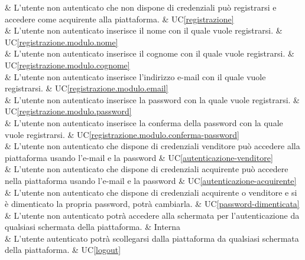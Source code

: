  & L'utente non autenticato che non dispone di credenziali può registrarsi e accedere come acquirente alla piattaforma. & UC\ref{registrazione} \\ 

 & L'utente non autenticato inserisce il nome con il quale vuole registrarsi. & UC\ref{registrazione.modulo.nome} \\

 & L'utente non autenticato inserisce il cognome con il quale vuole registrarsi. & UC\ref{registrazione.modulo.cognome} \\

 & L'utente non autenticato inserisce l'indirizzo e-mail con il quale vuole registrarsi. & UC\ref{registrazione.modulo.email} \\

 & L'utente non autenticato inserisce la password con la quale vuole registrarsi. & UC\ref{registrazione.modulo.password} \\

 & L'utente non autenticato inserisce la conferma della password con la quale vuole registrarsi. & UC\ref{registrazione.modulo.conferma-password} \\

 & L'utente non autenticato che dispone di credenziali venditore può accedere alla piattaforma usando l'e-mail e la password & UC\ref{autenticazione-venditore} \\

 & L'utente non autenticato che dispone di credenziali acquirente può accedere nella piattaforma usando l'e-mail e la password & UC\ref{autenticazione-acquirente} \\

 & L'utente non autenticato che dispone di credenziali acquirente o venditore e si è dimenticato la propria password, potrà cambiarla. & UC\ref{password-dimenticata} \\

 & L'utente non autenticato potrà accedere alla schermata per l'autenticazione da qualsiasi schermata della piattaforma. & Interna \\

 & L'utente autenticato potrà scollegarsi dalla piattaforma da qualsiasi schermata della piattaforma. & UC\ref{logout} \\
